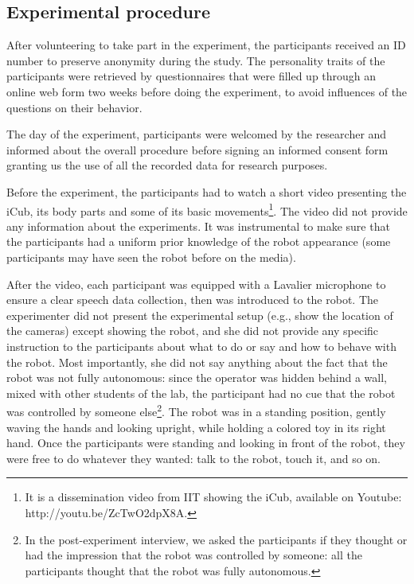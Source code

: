 \documentclass[twocolumn]{svjour3}          %
\begin{document}
\subsection{Experimental procedure}\label{section:protocol}


After volunteering to take part in the experiment, the participants received an ID number to preserve anonymity during the study. 
The personality traits of the participants were retrieved by questionnaires that were filled up through an online web form two weeks before doing the experiment, to avoid influences of the questions on their behavior.

The day of the experiment, participants were welcomed by the researcher and informed about the overall procedure before signing an informed consent form granting us the use of all the recorded data for research purposes.

Before the experiment, the participants had to watch a short video presenting the iCub, its body parts and some of its basic movements\footnote{It is a dissemination video from IIT showing the iCub, available on Youtube: {http://youtu.be/ZcTwO2dpX8A}.}. The video did not provide any information about the experiments. It was instrumental to make sure that the participants had a uniform prior knowledge of the robot appearance (some participants may have seen the robot before on the media).


After the video, each participant was equipped with a Lavalier microphone to ensure a clear speech data collection, then was introduced to the robot.
The experimenter did not present the experimental setup (e.g., show the location of the cameras) except showing the robot, and she did not provide any specific instruction to the participants about what to do or say and how to behave with the robot. 
Most importantly, she did not say anything about the 
fact that the robot was not fully autonomous:
since the operator was hidden behind a wall, mixed with other students of the lab, the participant had no cue that the robot was controlled by someone else\footnote{In the post-experiment interview, we asked the participants if they thought or had the impression that the robot was controlled by someone: all the participants thought that the robot was fully autonomous.}.
The robot was in a standing position, gently waving the hands and looking upright, while holding a colored toy in its right hand. 
Once the participants were standing and looking in front of the robot, they were free to do whatever they wanted: talk to the robot, touch it, and so on. 
\end{document}
